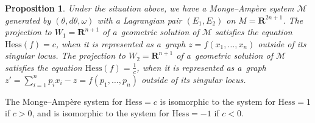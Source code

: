 \documentclass[11pt]{article}
\newtheorem{Prop}[Th]{Proposition}
\begin{document}
\begin{Prop}
Under the situation above,
we have a Monge--Amp{\`e}re system
$\mathcal{M}$ generated by $(\theta, d\theta, \omega)$
with a Lagrangian pair $(E_1,E_2)$ on $M={\mathbf R}^{2n+1}$.
The projection to $W_1 = {\mathbf{R}}^{n+1}$
of a~geometric solution of $\mathcal{M}$ satisfies the equation
$\textrm{Hess}(f)=c$, when it is represented as a~graph
$z = f(x_1,\dots,x_n)$
outside of its singular locus.
The projection to $W_2 = {\mathbf{R}}^{n+1}$
of a~geometric solution of $\mathcal{M}$ satisfies the equation
$\textrm{Hess}(f)=\frac{1}{c}$, when it is represented as a~graph
$z'=\sum\limits_{i=1}^np_ix_i-z = f(p_1,\dots,p_n)$
outside of its singular locus.
\end{Prop}

\begin{Rem}
The Monge--Amp{\`e}re system for ${\mathrm{Hess}} = c$
is isomorphic to the system for ${\mathrm{Hess}} = 1$ if $c > 0$, and
is isomorphic to the system for ${\mathrm{Hess}} = -1$ if $c < 0$.
\end{Rem}
\end{document}
